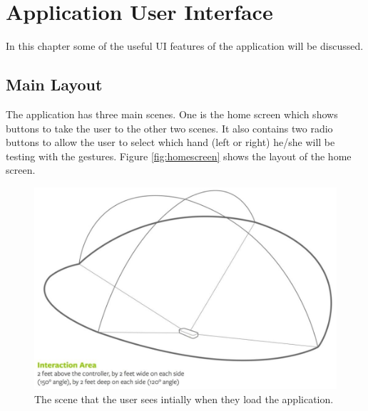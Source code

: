 \chapter{Application User Interface }

\label{Chapter6_appUI} 

In this chapter some of the useful UI features of the application will be discussed. 

\section{Main Layout}

The application has three main scenes. One is the home screen which shows buttons to take the user to the other two scenes. It also contains two radio buttons to allow the user to select which hand (left or right) he/she will be testing with the gestures. Figure  \ref{fig:homescreen} shows the layout of the home screen. 

\begin{figure}[H]
\centering
\includegraphics[scale=0.35]{Figures/LeapInteractionArea.JPG}
\caption[Home Screen Layout]{The scene that the user sees intially when they load the application.}
\label{fig:homeScreen}
\end{figure}

